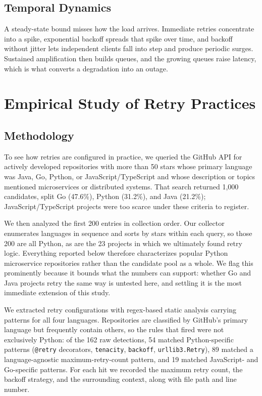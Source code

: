 \documentclass[conference]{IEEEtran}
\begin{document}
\subsection{Temporal Dynamics}

A steady-state bound misses how the load arrives. Immediate retries concentrate into a spike, exponential backoff spreads that spike over time, and backoff without jitter lets independent clients fall into step and produce periodic surges. Sustained amplification then builds queues, and the growing queues raise latency, which is what converts a degradation into an outage.

\section{Empirical Study of Retry Practices}
\label{sec:empirical}

\subsection{Methodology}

To see how retries are configured in practice, we queried the GitHub API for actively developed repositories with more than 50 stars whose primary language was Java, Go, Python, or JavaScript/TypeScript and whose description or topics mentioned microservices or distributed systems. That search returned 1,000 candidates, split Go (47.6\%), Python (31.2\%), and Java (21.2\%); JavaScript/TypeScript projects were too scarce under these criteria to register.

We then analyzed the first 200 entries in collection order. Our collector enumerates languages in sequence and sorts by stars within each query, so those 200 are all Python, as are the 23 projects in which we ultimately found retry logic. Everything reported below therefore characterizes popular Python microservice repositories rather than the candidate pool as a whole. We flag this prominently because it bounds what the numbers can support: whether Go and Java projects retry the same way is untested here, and settling it is the most immediate extension of this study.

We extracted retry configurations with regex-based static analysis carrying patterns for all four languages. Repositories are classified by GitHub's primary language but frequently contain others, so the rules that fired were not exclusively Python: of the 162 raw detections, 54 matched Python-specific patterns (\texttt{@retry} decorators, \texttt{tenacity}, \texttt{backoff}, \texttt{urllib3.Retry}), 89 matched a language-agnostic maximum-retry-count pattern, and 19 matched JavaScript- and Go-specific patterns. For each hit we recorded the maximum retry count, the backoff strategy, and the surrounding context, along with file path and line number.
\end{document}
